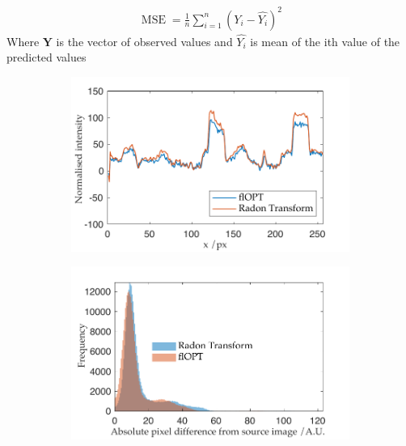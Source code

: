 \documentclass{osa-article}
\begin{document}
\begin{align}
  \operatorname{MSE}=\frac{1}{n}\sum_{i=1}^n{(Y_i-\hat{Y_i})}^2 \label{eq:mse}
\end{align}
Where \(\mathbf{Y}\) is the vector of observed values and \(\hat{Y_i}\) is mean of the ith value of the predicted values
\begin{figure}
  \centering
  \begin{subfigure}[t]{0.45\linewidth}
    \centering
    \includegraphics[width=\linewidth]{./figures/results/comparison_line_profile}
    \caption{}\label{fig:flopt_comparison_line_profile}
  \end{subfigure}\quad
  \begin{subfigure}[t]{0.45\linewidth}
    \centering
    \includegraphics[width=\linewidth]{./figures/results/flopt_histogram}

\end{subfigure}
\end{figure}
\end{document}
